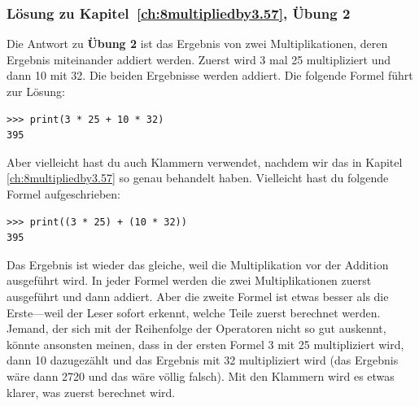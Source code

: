 \noindent
\subsubsection{Lösung zu Kapitel~\ref{ch:8multipliedby3.57}, Übung 2}
Die Antwort zu \textbf{Übung 2} ist das Ergebnis von zwei Multiplikationen, deren Ergebnis miteinander addiert werden. Zuerst wird 3 mal 25 multipliziert und dann 10 mit 32. Die beiden Ergebnisse werden addiert. Die folgende Formel führt zur Lösung:

\begin{Verbatim}[frame=single]
>>> print(3 * 25 + 10 * 32)
395
\end{Verbatim}

\noindent
Aber vielleicht hast du auch Klammern verwendet, nachdem wir das in  Kapitel \ref{ch:8multipliedby3.57} so genau behandelt haben. Vielleicht hast du folgende Formel aufgeschrieben:

\begin{Verbatim}[frame=single]
>>> print((3 * 25) + (10 * 32))
395
\end{Verbatim}

\noindent
Das Ergebnis ist wieder das gleiche, weil die Multiplikation vor der Addition ausgeführt wird. In jeder Formel werden die zwei Multiplikationen zuerst ausgeführt und dann addiert. Aber die zweite Formel ist etwas besser als die Erste---weil der Leser sofort erkennt, welche Teile zuerst berechnet werden. Jemand, der sich mit der Reihenfolge der Operatoren nicht so gut auskennt, könnte ansonsten meinen, dass in der ersten Formel 3 mit 25 multipliziert wird, dann 10 dazugezählt und das Ergebnis mit 32 multipliziert wird (das Ergebnis wäre dann 2720 und das wäre völlig falsch). Mit den Klammern wird es etwas klarer, was zuerst berechnet wird.

